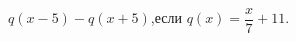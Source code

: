 \begin{ex}
	\begin{condition}
		\( q(x-5)-q(x+5) \),\quad если \( q(x)=\dfrac{x}{7}+11 \).
	\end{condition}
\end{ex}